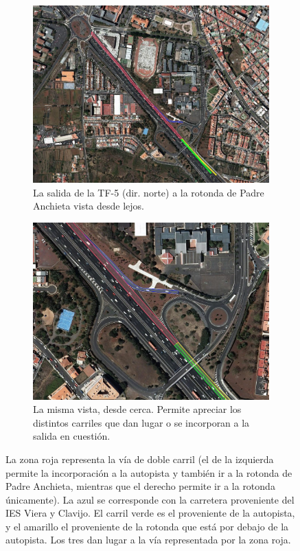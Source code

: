 \begin{figure}[ht]
    \centering
    \begin{subfigure}[t]{0.48\textwidth}
      \centering
      \includegraphics[width=\textwidth]{report/images/salida-tf5-norte-lejos_.png}
      \caption{La salida de la TF-5 (dir. norte) a la rotonda de Padre Anchieta vista desde lejos.}
      \label{fig:salida-tf5-norte-lejos}
    \end{subfigure}
    \hfill
    \begin{subfigure}[t]{0.48\textwidth}
      \centering
      \includegraphics[width=\textwidth]{report/images/salida-tf5-norte-cerca_.png}
      \caption{La misma vista, desde cerca. Permite apreciar los distintos carriles que dan lugar o se incorporan a la salida en cuestión.}
      \label{fig:salida-tf5-norte-cerca}
    \end{subfigure}%
    \caption{La zona roja representa la vía de doble carril (el de la izquierda permite la incorporación a la autopista y también ir a la rotonda de Padre Anchieta, mientras que el derecho permite ir a la rotonda únicamente). La azul se corresponde con la carretera proveniente del IES Viera y Clavijo. El carril verde es el proveniente de la autopista, y el amarillo el proveniente de la rotonda que está por debajo de la autopista. Los tres dan lugar a la vía representada por la zona roja.}
    \label{fig:salida-tf5-norte}
\end{figure}

